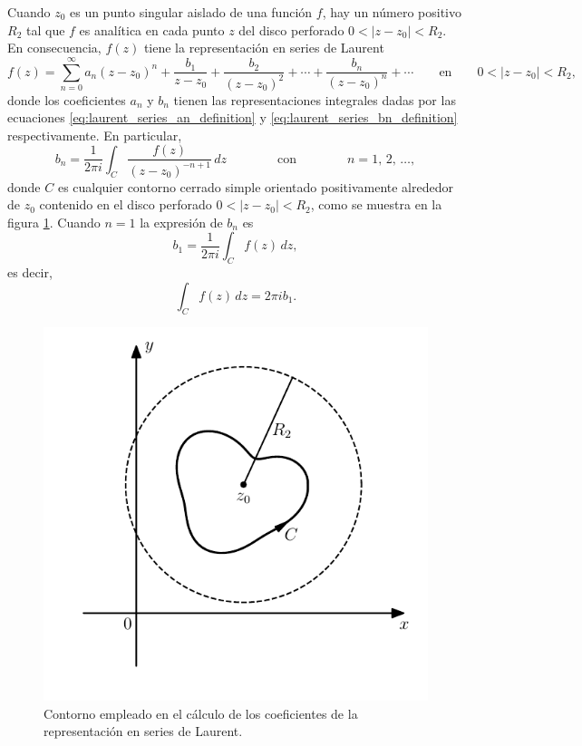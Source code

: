 \documentclass[a4paper]{report}
\begin{document}
Cuando \(z_0\) es un punto singular aislado de una función \(f\), hay un número positivo \(R_2\) tal que \(f\) es analítica en cada punto \(z\) del disco perforado \(0<|z-z_0|<R_2\). En consecuencia, \(f(z)\) tiene la representación en series de Laurent
\begin{equation}\label{eq:residues_laurent_expansion}
 f(z)=\sum_{n=0}^\infty a_n(z-z_0)^n+\frac{b_1}{z-z_0}+\frac{b_2}{(z-z_0)^2}+\cdots+\frac{b_n}{(z-z_0)^n}+\cdots 
 \qquad\textrm{en}\qquad
 0<|z-z_0|<R_2,  
\end{equation}
donde los coeficientes \(a_n\) y \(b_n\) tienen las representaciones integrales dadas por las ecuaciones \ref{eq:laurent_series_an_definition} y \ref{eq:laurent_series_bn_definition} respectivamente. En particular,
\[
 b_n=\frac{1}{2\pi i}\int_C\frac{f(z)}{(z-z_0)^{-n+1}}\,dz
 \qquad\qquad\textrm{con}\qquad\qquad
 n=1,\,2,\,\dots,
\]
donde \(C\) es cualquier contorno cerrado simple orientado positivamente alrededor de \(z_0\) contenido en el disco perforado \(0<|z-z_0|<R_2\), como se muestra en la figura \ref{fig:residues_integral_evaluation}. Cuando \(n=1\) la expresión de \(b_n\) es
\[
 b_1=\frac{1}{2\pi i}\int_C f(z)\,dz,
\]
es decir,
\begin{equation}\label{eq:residues_integral_evaluation_b1}
 \int_C f(z)\,dz=2\pi ib_1. 
\end{equation}
\begin{figure}[!htb]
  \begin{minipage}[c]{0.5\textwidth}
    \includegraphics[width=\textwidth]{figuras/residues_integral_evaluation.pdf}
  \end{minipage}\hfill
  \begin{minipage}[c]{0.4\textwidth}
    \caption{
       Contorno empleado en el cálculo de los coeficientes de la representación en series de Laurent.
    }\label{fig:residues_integral_evaluation}
  \end{minipage}
\end{figure}
\end{document}
